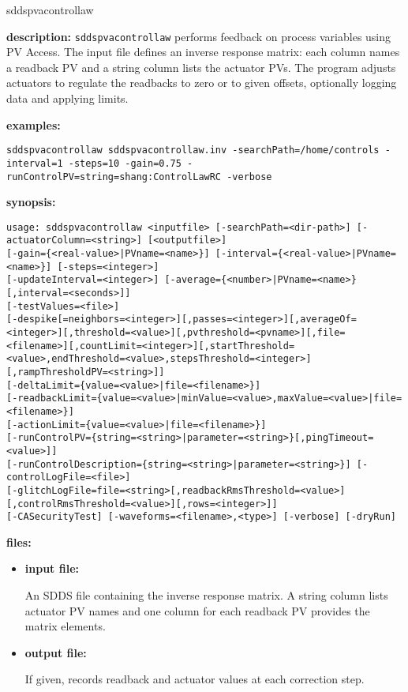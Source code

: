 %
\begin{sddsprog}{sddspvacontrollaw}
\item \textbf{description:}
\verb+sddspvacontrollaw+ performs feedback on process variables using PV Access. The
input file defines an inverse response matrix: each column names a readback PV and a
string column lists the actuator PVs. The program adjusts actuators to regulate the
readbacks to zero or to given offsets, optionally logging data and applying limits.

\item \textbf{examples:}
\begin{verbatim}
sddspvacontrollaw sddspvacontrollaw.inv -searchPath=/home/controls -interval=1 -steps=10 -gain=0.75 -runControlPV=string=shang:ControlLawRC -verbose
\end{verbatim}

\item \textbf{synopsis:}
\begin{verbatim}
usage: sddspvacontrollaw <inputfile> [-searchPath=<dir-path>] [-actuatorColumn=<string>] [<outputfile>]
[-gain={<real-value>|PVname=<name>}] [-interval={<real-value>|PVname=<name>}] [-steps=<integer>]
[-updateInterval=<integer>] [-average={<number>|PVname=<name>}[,interval=<seconds>]]
[-testValues=<file>]
[-despike[=neighbors=<integer>][,passes=<integer>][,averageOf=<integer>][,threshold=<value>][,pvthreshold=<pvname>][,file=<filename>][,countLimit=<integer>][,startThreshold=<value>,endThreshold=<value>,stepsThreshold=<integer>][,rampThresholdPV=<string>]]
[-deltaLimit={value=<value>|file=<filename>}]
[-readbackLimit={value=<value>|minValue=<value>,maxValue=<value>|file=<filename>}]
[-actionLimit={value=<value>|file=<filename>}]
[-runControlPV={string=<string>|parameter=<string>}[,pingTimeout=<value>]]
[-runControlDescription={string=<string>|parameter=<string>}] [-controlLogFile=<file>]
[-glitchLogFile=file=<string>[,readbackRmsThreshold=<value>][,controlRmsThreshold=<value>][,rows=<integer>]]
[-CASecurityTest] [-waveforms=<filename>,<type>] [-verbose] [-dryRun]
\end{verbatim}

\item \textbf{files:}
\begin{itemize}
  \item \textbf{input file:} \par
    An SDDS file containing the inverse response matrix. A string column lists actuator PV names and one column for each readback PV provides the matrix elements.
  \item \textbf{output file:} \par
    If given, records readback and actuator values at each correction step.
\end{itemize}


\end{sddsprog}
